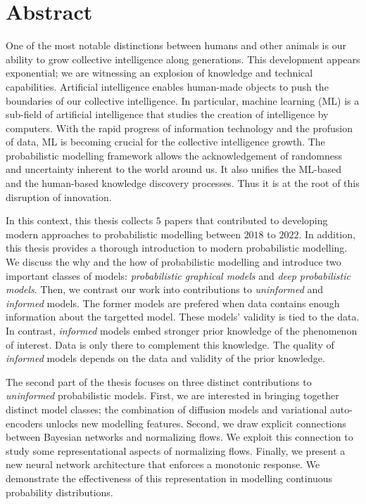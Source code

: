 
\chapter*{Abstract}
One of the most notable distinctions between humans and other animals is our ability to grow collective intelligence along generations. This development appears exponential; we are witnessing an explosion of knowledge and technical capabilities. Artificial intelligence enables human-made objects to push the boundaries of our collective intelligence. In particular, machine learning (ML) is a sub-field of artificial intelligence that studies the creation of intelligence by computers. With the rapid progress of information technology and the profusion of data, ML is becoming crucial for the collective intelligence growth.
The probabilistic modelling framework allows the acknowledgement of randomness and uncertainty inherent to the world around us. It also unifies the ML-based and the human-based knowledge discovery processes.
Thus it is at the root of this disruption of innovation.

In this context, this thesis collects $5$ papers that contributed to developing modern approaches to probabilistic modelling between $2018$ to $2022$.
In addition, this thesis provides a thorough introduction to modern probabilistic modelling. We discuss the why and the how of probabilistic modelling and introduce two important classes of models: \textit{probabilistic graphical models} and \textit{deep probabilistic models}. Then, we contrast our work into contributions to \textit{uninformed} and \textit{informed} models. The former models are prefered when data contains enough information about the targetted model. These models' validity is tied to the data. In contrast, \textit{informed} models embed stronger prior knowledge of the phenomenon of interest. Data is only there to complement this knowledge. The quality of \textit{informed} models depends on the data and validity of the prior knowledge.

The second part of the thesis focuses on three distinct contributions to \textit{uninformed} probabilistic models. First, we are interested in bringing together distinct model classes; the combination of diffusion models and variational auto-encoders unlocks new modelling features. Second, we draw explicit connections between Bayesian networks and normalizing flows. We exploit this connection to study some representational aspects of normalizing flows. Finally, we present a new neural network architecture that enforces a monotonic response. We demonstrate the effectiveness of this representation in modelling continuous probability distributions.

